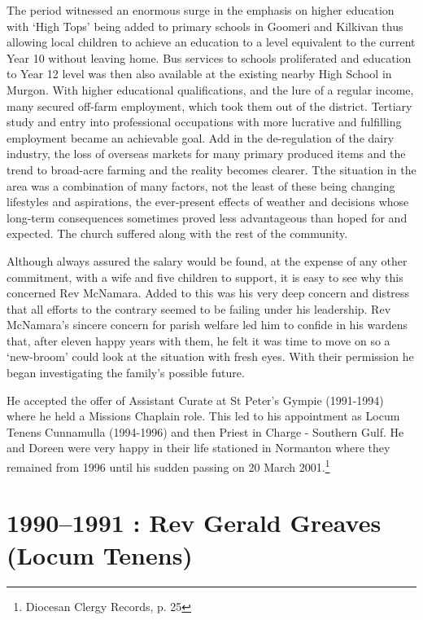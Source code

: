 The period witnessed an enormous surge in the emphasis on higher education with `High Tops' being added to primary schools in Goomeri and Kilkivan thus allowing local children to achieve an education to a level equivalent to the current Year 10 without leaving home. Bus services to schools proliferated and education to Year 12 level was then also available at the existing nearby High School in Murgon. With higher educational qualifications, and the lure of a regular income, many secured off-farm employment, which took them out of the district. Tertiary study and entry into professional occupations with more lucrative and fulfilling employment became an achievable goal. Add in the de-regulation of the dairy industry, the loss of overseas markets for many primary produced items and the trend to broad-acre farming and the reality becomes clearer. Tthe situation in the area was a combination of many factors, not the least of these being changing lifestyles and aspirations, the ever-present effects of weather and decisions whose long-term consequences sometimes proved less advantageous than hoped for and expected. The church suffered along with the rest of the community.

Although always assured the salary would be found, at the expense of any other commitment, with a wife and five children to support, it is easy to see why this concerned Rev McNamara. Added to this was his very deep concern and distress that all efforts to the contrary seemed to be failing under his leadership. Rev McNamara's sincere concern for parish welfare led him to confide in his wardens that, after eleven happy years with them, he felt it was time to move on so a `new-broom' could look at the situation with fresh eyes. With their permission he began investigating the family's possible future.

He accepted the offer of Assistant Curate at St Peter's Gympie (1991-1994) where he held a Missions Chaplain role. This led to his appointment as Locum Tenens Cunnamulla (1994-1996) and then Priest in Charge - Southern Gulf. He and Doreen were very happy in their life stationed in Normanton where they remained from 1996 until his sudden passing on 20 March 2001.\footnote{Diocesan Clergy Records, p. 25}

\hypertarget{rev-gerald-greaves-locum-tenens}{%
\section{1990--1991 : Rev Gerald Greaves (Locum Tenens)}\label{rev-gerald-greaves-locum-tenens}}

